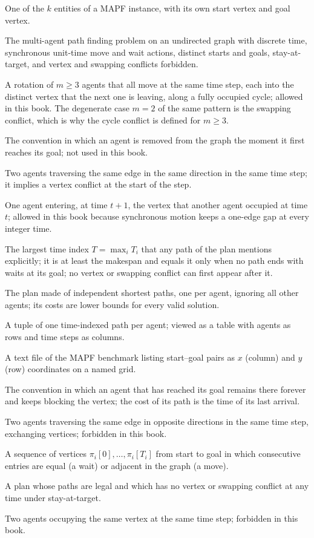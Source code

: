 \item[Agent] One of the $k$ entities of a MAPF instance, with its own start vertex and goal vertex.
\item[Classical MAPF] The multi-agent path finding problem on an undirected graph with discrete time, synchronous unit-time move and wait actions, distinct starts and goals, stay-at-target, and vertex and swapping conflicts forbidden.
\item[Cycle conflict] A rotation of $m\ge3$ agents that all move at the same time step, each into the distinct vertex that the next one is leaving, along a fully occupied cycle; allowed in this book. The degenerate case $m=2$ of the same pattern is the swapping conflict, which is why the cycle conflict is defined for $m\ge3$.
\item[Disappear-at-target] The convention in which an agent is removed from the graph the moment it first reaches its goal; not used in this book.
\item[Edge conflict] Two agents traversing the same edge in the same direction in the same time step; it implies a vertex conflict at the start of the step.
\item[Following conflict] One agent entering, at time $t+1$, the vertex that another agent occupied at time $t$; allowed in this book because synchronous motion keeps a one-edge gap at every integer time.
\item[Horizon of a plan] The largest time index $T=\max_i T_i$ that any path of the plan mentions explicitly; it is at least the makespan and equals it only when no path ends with waits at its goal; no vertex or swapping conflict can first appear after it.
\item[Naive plan] The plan made of independent shortest paths, one per agent, ignoring all other agents; its costs are lower bounds for every valid solution.
\item[Plan (MAPF)] A tuple of one time-indexed path per agent; viewed as a table with agents as rows and time steps as columns.
\item[Scenario file] A  text file of the MAPF benchmark listing start--goal pairs as $x$ (column) and $y$ (row) coordinates on a named  grid.
\item[Stay-at-target] The convention in which an agent that has reached its goal remains there forever and keeps blocking the vertex; the cost of its path is the time of its last arrival.
\item[Swapping conflict] Two agents traversing the same edge in opposite directions in the same time step, exchanging vertices; forbidden in this book.
\item[Time-indexed path] A sequence of vertices $\pi_i[0],\dots,\pi_i[T_i]$ from start to goal in which consecutive entries are equal (a wait) or adjacent in the graph (a move).
\item[Valid solution] A plan whose paths are legal and which has no vertex or swapping conflict at any time under stay-at-target.
\item[Vertex conflict] Two agents occupying the same vertex at the same time step; forbidden in this book.
